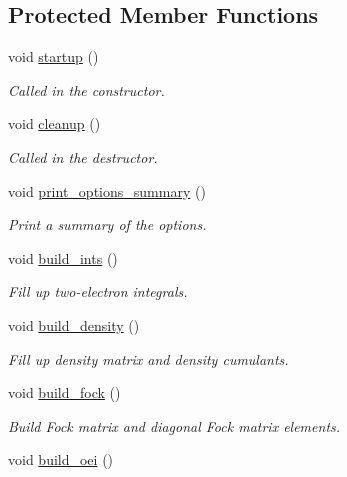\subsection*{Protected Member Functions}
\begin{DoxyCompactItemize}
\item 
void \mbox{\hyperlink{classforte_1_1_d_s_r_g___m_r_p_t2_ab386924d3bc56b2a95912e860cdc5c50}{startup}} ()
\begin{DoxyCompactList}\small\item\em Called in the constructor. \end{DoxyCompactList}\item 
void \mbox{\hyperlink{classforte_1_1_d_s_r_g___m_r_p_t2_a278ccce08fe45126a0386196a14e00b6}{cleanup}} ()
\begin{DoxyCompactList}\small\item\em Called in the destructor. \end{DoxyCompactList}\item 
void \mbox{\hyperlink{classforte_1_1_d_s_r_g___m_r_p_t2_aa9aa3365f09c4a576a61bfb21c18e046}{print\+\_\+options\+\_\+summary}} ()
\begin{DoxyCompactList}\small\item\em Print a summary of the options. \end{DoxyCompactList}\item 
void \mbox{\hyperlink{classforte_1_1_d_s_r_g___m_r_p_t2_a16fb184164a8c89e1cde94058a093837}{build\+\_\+ints}} ()
\begin{DoxyCompactList}\small\item\em Fill up two-\/electron integrals. \end{DoxyCompactList}\item 
void \mbox{\hyperlink{classforte_1_1_d_s_r_g___m_r_p_t2_ab4fe26704d651cd9d1f80badf75210aa}{build\+\_\+density}} ()
\begin{DoxyCompactList}\small\item\em Fill up density matrix and density cumulants. \end{DoxyCompactList}\item 
void \mbox{\hyperlink{classforte_1_1_d_s_r_g___m_r_p_t2_adfd852f4cb7195744dc190d3615164ac}{build\+\_\+fock}} ()
\begin{DoxyCompactList}\small\item\em Build Fock matrix and diagonal Fock matrix elements. \end{DoxyCompactList}\item 
void \mbox{\hyperlink{classforte_1_1_d_s_r_g___m_r_p_t2_a84199d62bbbf1352c5eac34ea53f2972}{build\+\_\+oei}} ()

\end{DoxyCompactItemize}
